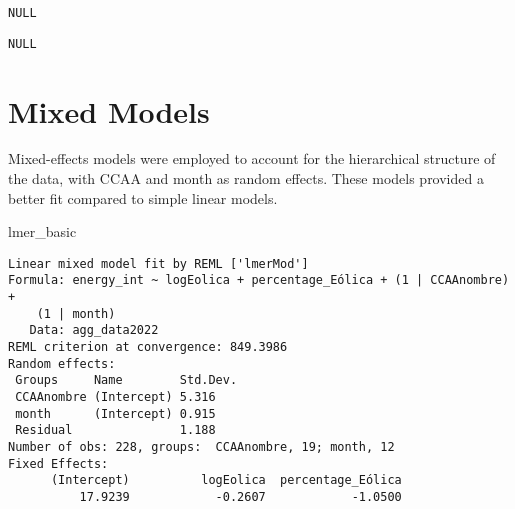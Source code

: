 \documentclass[
]{report}
\newenvironment{Shaded}{\begin{snugshade}}{\end{snugshade}}
\newcommand{\AttributeTok}[1]{\textcolor[rgb]{0.40,0.45,0.13}{#1}}
\newcommand{\DecValTok}[1]{\textcolor[rgb]{0.68,0.00,0.00}{#1}}
\newcommand{\FunctionTok}[1]{\textcolor[rgb]{0.28,0.35,0.67}{#1}}
\newcommand{\NormalTok}[1]{\textcolor[rgb]{0.00,0.23,0.31}{#1}}
\newcommand{\OtherTok}[1]{\textcolor[rgb]{0.00,0.23,0.31}{#1}}
\newcommand{\SpecialCharTok}[1]{\textcolor[rgb]{0.37,0.37,0.37}{#1}}
\newcommand{\StringTok}[1]{\textcolor[rgb]{0.13,0.47,0.30}{#1}}
\begin{document}
\begin{Shaded}
\end{Shaded}

\begin{verbatim}
NULL
\end{verbatim}

\begin{Shaded}
\end{Shaded}

\begin{verbatim}
NULL
\end{verbatim}

\hypertarget{mixed-models}{%
\section{Mixed Models}\label{mixed-models}}

Mixed-effects models were employed to account for the hierarchical
structure of the data, with CCAA and month as random effects. These
models provided a better fit compared to simple linear models.

\begin{Shaded}
\begin{Highlighting}[]
\NormalTok{lmer\_basic}
\end{Highlighting}
\end{Shaded}

\begin{verbatim}
Linear mixed model fit by REML ['lmerMod']
Formula: energy_int ~ logEolica + percentage_Eólica + (1 | CCAAnombre) +  
    (1 | month)
   Data: agg_data2022
REML criterion at convergence: 849.3986
Random effects:
 Groups     Name        Std.Dev.
 CCAAnombre (Intercept) 5.316   
 month      (Intercept) 0.915   
 Residual               1.188   
Number of obs: 228, groups:  CCAAnombre, 19; month, 12
Fixed Effects:
      (Intercept)          logEolica  percentage_Eólica  
          17.9239            -0.2607            -1.0500  
\end{verbatim}
\end{document}
